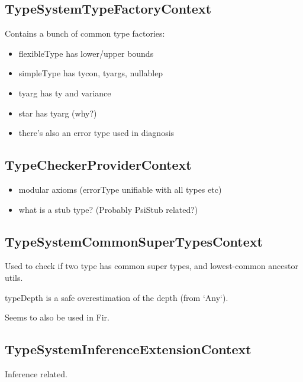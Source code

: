 \documentclass{article}
\begin{document}
\subsection{TypeSystemTypeFactoryContext}

Contains a bunch of common type factories:

\begin{itemize}
    \item flexibleType has lower/upper bounds
    \item simpleType has tycon, tyargs, nullablep
    \item tyarg has ty and variance
    \item star has tyarg (why?)
    \item there's also an error type used in diagnosis
\end{itemize}

\subsection{TypeCheckerProviderContext}

\begin{itemize}
    \item modular axioms (errorType unifiable with all types etc)
    \item what is a stub type? (Probably PsiStub related?)
\end{itemize}

\subsection{TypeSystemCommonSuperTypesContext}

Used to check if two type has common super types, and lowest-common ancestor utils.

typeDepth is a safe overestimation of the depth (from `Any`).

Seems to also be used in Fir.

\subsection{TypeSystemInferenceExtensionContext}

Inference related.
\end{document}
